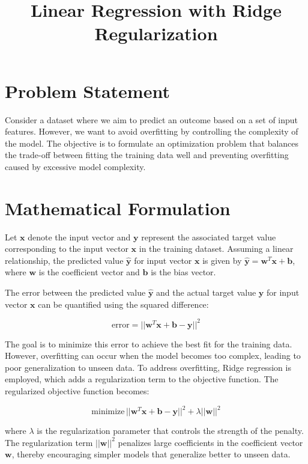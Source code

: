 \documentclass{article}
\begin{document}
\title{Linear Regression with Ridge Regularization}
\author{}
\date{}
\maketitle

\section*{Problem Statement}

Consider a dataset where we aim to predict an outcome based on a set of input features. However, we want to avoid overfitting by controlling the complexity of the model. The objective is to formulate an optimization problem that balances the trade-off between fitting the training data well and preventing overfitting caused by excessive model complexity.

\section*{Mathematical Formulation}

Let $\mathbf{x}$ denote the input vector and $\mathbf{y}$ represent the associated target value corresponding to the input vector $\mathbf{x}$ in the training dataset. Assuming a linear relationship, the predicted value $\hat{\mathbf{y}}$ for input vector $\mathbf{x}$ is given by $\hat{\mathbf{y}} = \mathbf{w}^T \mathbf{x} + \mathbf{b}$, where $\mathbf{w}$ is the coefficient vector and $\mathbf{b}$ is the bias vector.

The error between the predicted value $\hat{\mathbf{y}}$ and the actual target value $\mathbf{y}$ for input vector $\mathbf{x}$ can be quantified using the squared difference:

\[
\text{error} = || \mathbf{w}^T \mathbf{x} + \mathbf{b} - \mathbf{y} ||^2
\]

The goal is to minimize this error to achieve the best fit for the training data. However, overfitting can occur when the model becomes too complex, leading to poor generalization to unseen data. To address overfitting, Ridge regression is employed, which adds a regularization term to the objective function. The regularized objective function becomes:

\[
\text{minimize} \, || \mathbf{w}^T \mathbf{x} + \mathbf{b} - \mathbf{y} ||^2 + \lambda || \mathbf{w} ||^2
\]

where $\lambda$ is the regularization parameter that controls the strength of the penalty. The regularization term $|| \mathbf{w} ||^2$ penalizes large coefficients in the coefficient vector $\mathbf{w}$, thereby encouraging simpler models that generalize better to unseen data.
\end{document}
